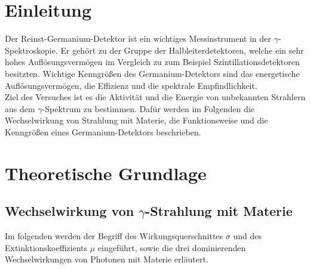\section{Einleitung}
Der Reinst-Germanium-Detektor ist ein wichtiges Messinstrument in der $\gamma$-Spektroskopie. Er gehört zu der Gruppe der Halbleiterdetektoren, welche ein sehr hohes Auflösungsvermögen im Vergleich zu zum Beispiel Szintillationsdetektoren besitzten. Wichtige Kenngrößen des Germanium-Detektors sind das energetische Auflösungsvermögen, die Effizienz und die spektrale Empfindlichkeit. \\
Ziel des Versuches ist es die Aktivität und die Energie von unbekannten Strahlern aus dem $\gamma$-Spektrum zu bestimmen. Dafür werden im Folgenden die Wechselwirkung von Strahlung mit Materie, die Funktionsweise und die Kenngrößen eines Germanium-Detektors beschrieben. \\


\section{Theoretische Grundlage}
\label{sec:Theorie}

\subsection{Wechselwirkung von \texorpdfstring{$\gamma$}{}-Strahlung mit Materie}
Im folgenden werden der Begriff des Wirkungsquerschnittes $\sigma$ und des Extinktionskoeffizients $\mu$ eingeführt, sowie die drei dominierenden Wechselwirkungen von Photonen mit Materie erläutert.



